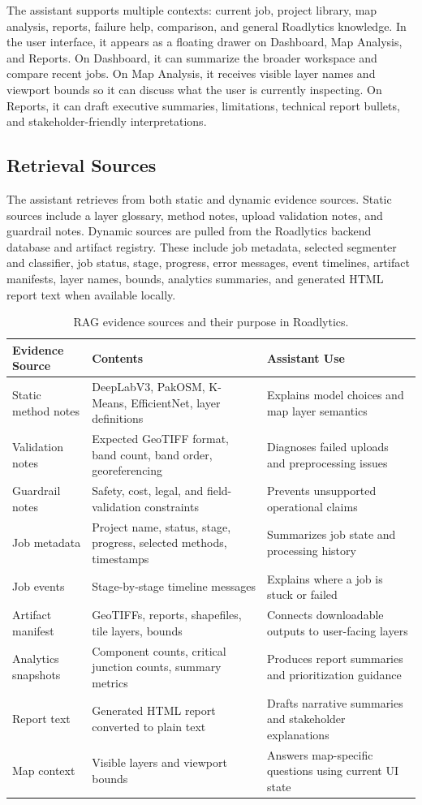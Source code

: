 ﻿\documentclass[conference]{IEEEtran}
\begin{document}
The assistant supports multiple contexts: current job, project library, map analysis, reports, failure help, comparison, and general Roadlytics knowledge. In the user interface, it appears as a floating drawer on Dashboard, Map Analysis, and Reports. On Dashboard, it can summarize the broader workspace and compare recent jobs. On Map Analysis, it receives visible layer names and viewport bounds so it can discuss what the user is currently inspecting. On Reports, it can draft executive summaries, limitations, technical report bullets, and stakeholder-friendly interpretations.

\subsection{Retrieval Sources}
The assistant retrieves from both static and dynamic evidence sources. Static sources include a layer glossary, method notes, upload validation notes, and guardrail notes. Dynamic sources are pulled from the Roadlytics backend database and artifact registry. These include job metadata, selected segmenter and classifier, job status, stage, progress, error messages, event timelines, artifact manifests, layer names, bounds, analytics summaries, and generated HTML report text when available locally.

\begin{table}[!t]
\caption{RAG evidence sources and their purpose in Roadlytics.}
\centering
\begin{tabularx}{\textwidth}{lYY}
\toprule
\textbf{Evidence Source} & \textbf{Contents} & \textbf{Assistant Use} \\
\midrule
Static method notes & DeepLabV3, PakOSM, K-Means, EfficientNet, layer definitions & Explains model choices and map layer semantics \\
Validation notes & Expected GeoTIFF format, band count, band order, georeferencing & Diagnoses failed uploads and preprocessing issues \\
Guardrail notes & Safety, cost, legal, and field-validation constraints & Prevents unsupported operational claims \\
Job metadata & Project name, status, stage, progress, selected methods, timestamps & Summarizes job state and processing history \\
Job events & Stage-by-stage timeline messages & Explains where a job is stuck or failed \\
Artifact manifest & GeoTIFFs, reports, shapefiles, tile layers, bounds & Connects downloadable outputs to user-facing layers \\
Analytics snapshots & Component counts, critical junction counts, summary metrics & Produces report summaries and prioritization guidance \\
Report text & Generated HTML report converted to plain text & Drafts narrative summaries and stakeholder explanations \\
Map context & Visible layers and viewport bounds & Answers map-specific questions using current UI state \\
\bottomrule
\end{tabularx}
\end{table}
\end{document}
